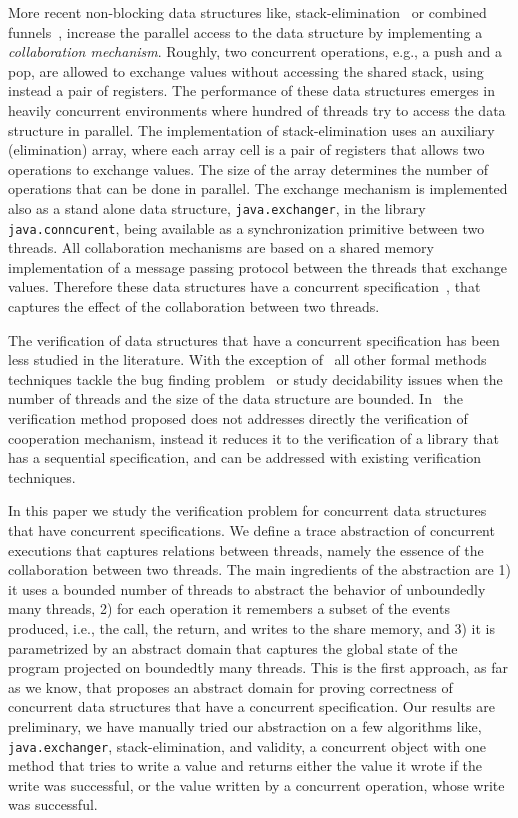 More recent non-blocking data structures like, stack-elimination~\cite{elimination} or combined funnels~\cite{ShavitZ98}, increase the parallel access to the data structure by implementing a {\em collaboration mechanism}. Roughly, two concurrent operations, e.g., a push and a pop, are allowed to exchange values without accessing the shared stack, using instead a pair of registers. The performance of these data structures emerges in heavily concurrent environments  where hundred of threads try to access the data structure in parallel. The implementation  of stack-elimination uses an auxiliary (elimination) array, where each array cell is a pair of registers that allows two operations to exchange values. The size of the array determines the number of operations that can be done in parallel.  
The exchange mechanism is implemented also as a stand alone data structure, \texttt{java.exchanger}, in the library \texttt{java.conncurent}, being available as a synchronization primitive between two threads. 
All collaboration mechanisms are based on a shared memory implementation of a message passing protocol between the threads that exchange values. 
Therefore these data structures have a concurrent specification~\cite{disc15}, that captures the effect of the collaboration between two threads. 

The verification of data structures that have a concurrent specification has been less studied in the literature. With the exception of~\cite{cav13} all other formal methods techniques tackle the bug finding problem~\cite{ee1,ee2} or study decidability issues when the number of threads and the size of the data structure are bounded. In~\cite{cav13} the verification method proposed does not addresses directly the verification of cooperation mechanism, instead it reduces it to the verification of a library that has a sequential specification, and can be addressed with existing verification techniques. 



In this paper we study the verification problem for concurrent data structures that have concurrent specifications. We define a trace abstraction of concurrent executions that captures relations between threads, namely the essence of the collaboration between two threads. 
The main ingredients of the abstraction are 1) it uses a bounded number of threads to abstract the behavior of unboundedly many  threads,  2) for each operation it remembers a subset of the events produced, i.e., the call, the return, and writes to the share memory, and 
 3) it is parametrized by an abstract domain that captures the global state of the program projected on boundedtly many threads. 
This is the first approach, as far as we know, that proposes an abstract domain for proving correctness of concurrent data structures that have a concurrent specification.  Our results are preliminary, we have manually tried our abstraction on a few algorithms like, \texttt{java.exchanger}, stack-elimination, and validity, a concurrent object with one method that tries to write a value and returns either the value it wrote if the write was successful, or the value written by a concurrent operation, whose write was successful.   
 
